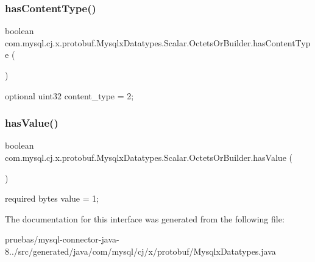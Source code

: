 \subsubsection{\texorpdfstring{has\+Content\+Type()}{hasContentType()}}
{\footnotesize\ttfamily boolean com.\+mysql.\+cj.\+x.\+protobuf.\+Mysqlx\+Datatypes.\+Scalar.\+Octets\+Or\+Builder.\+has\+Content\+Type (\begin{DoxyParamCaption}{ }\end{DoxyParamCaption})}

{\ttfamily optional uint32 content\+\_\+type = 2;} \mbox{\label{interfacecom_1_1mysql_1_1cj_1_1x_1_1protobuf_1_1_mysqlx_datatypes_1_1_scalar_1_1_octets_or_builder_a2596e5239331a6c435e18f17db0069fe}} 
\subsubsection{\texorpdfstring{has\+Value()}{hasValue()}}
{\footnotesize\ttfamily boolean com.\+mysql.\+cj.\+x.\+protobuf.\+Mysqlx\+Datatypes.\+Scalar.\+Octets\+Or\+Builder.\+has\+Value (\begin{DoxyParamCaption}{ }\end{DoxyParamCaption})}

{\ttfamily required bytes value = 1;} 

The documentation for this interface was generated from the following file\+:\begin{DoxyCompactItemize}
\item 
pruebas/mysql-\/connector-\/java-\/8../src/generated/java/com/mysql/cj/x/protobuf/Mysqlx\+Datatypes.\+java\end{DoxyCompactItemize}
